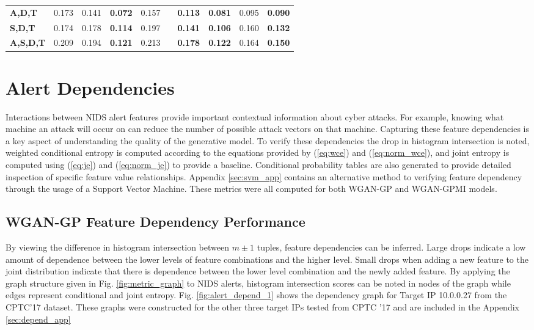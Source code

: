 \begin{table}[!htbp]
\begin{adjustbox}{angle=90}
\begin{tabular}{l|c|c|c|c|c|c|c|c|c|}
			\textbf{A,D,T} & 0.173 & 0.141 & \textbf{0.072} & 0.157 &  & \textbf{0.113} & \textbf{0.081} & 0.095 & \textbf{0.090} \\
			\textbf{S,D,T} & 0.174 & 0.178 & \textbf{0.114} & 0.197 &  & \textbf{0.141} & \textbf{0.106} & 0.160 & \textbf{0.132} \\ \hline
			\textbf{A,S,D,T} & 0.209 & 0.194 & \textbf{0.121} & 0.213 &  & \textbf{0.178} & \textbf{0.122} & 0.164 & \textbf{0.150} \\
		\end{tabular}
	\end{adjustbox}
\end{table}


\section{Alert Dependencies}
\label{sec:depend}

Interactions between NIDS alert features provide important contextual information about cyber attacks. For example, knowing what machine an attack will occur on can reduce the number of possible attack vectors on that machine. Capturing these feature dependencies is a key aspect of understanding the quality of the generative model. To verify these dependencies the drop in histogram intersection is noted, weighted conditional entropy is computed according to the equations provided by (\ref{eq:wce}) and (\ref{eq:norm_wce}), and joint entropy is computed using (\ref{eq:je}) and (\ref{eq:norm_je}) to provide a baseline. Conditional probability tables are also generated to provide detailed inspection of specific feature value relationships. Appendix \ref{sec:svm_app} contains an alternative method to verifying feature dependency through the usage of a Support Vector Machine. These metrics were all computed for both WGAN-GP and WGAN-GPMI models. 

\subsection{WGAN-GP Feature Dependency Performance}

By viewing the difference in histogram intersection between $m\pm1$ tuples, feature dependencies can be inferred. Large drops indicate a low amount of dependence between the lower levels of feature combinations and the higher level. Small drops when adding a new feature to the joint distribution indicate that there is dependence between the lower level combination and the newly added feature. By applying the graph structure given in Fig. \ref{fig:metric_graph} to NIDS alerts, histogram intersection scores can be noted in nodes of the graph while edges represent conditional and joint entropy. Fig. \ref{fig:alert_depend_1} shows the dependency graph for Target IP 10.0.0.27 from the CPTC'17 dataset. These graphs were constructed for the other three target IPs tested from CPTC '17 and are included in the Appendix \ref{sec:depend_app}

